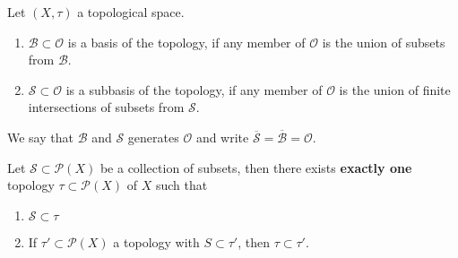 \begin{defbox}
    \begin{definition}[Base]
        Let \((X, \tau)\) a {\color{mathif}topological space}.
        \begin{enumerate}
            \item \(\mathcal{B} \subset \mathcal{O}\) is a {\color{maththen}basis} of the topology, if any member of \(\mathcal{O}\) is the {\color{mathif}union of subsets} from \(\mathcal{B}\).
            \item \(\mathcal{S} \subset \mathcal{O}\) is a {\color{maththen}subbasis} of the topology, if any member of \(\mathcal{O}\) is the {\color{mathif}union of finite intersections of subsets} from \(\mathcal{S}\).
        \end{enumerate}
        We say that \(\mathcal{B}\) and \(\mathcal{S}\) {\color{maththen}generates} \(\mathcal{O}\) and write \(\overline{\mathcal{S}} = \overline{\mathcal{B}} = \mathcal{O}\).
    \end{definition}
\end{defbox}

\begin{thmbox}
    \begin{lemma}
    Let \(\mathcal{S} \subset \mathcal{P}(X)\) be a {\color{mathobj}collection of subsets}, then there {\color{maththen}exists} \textbf{exactly one} topology \(\tau \subset \mathcal{P}(X)\) of \(X\) such that
    \begin{enumerate}
        \item \(\mathcal{S} \subset \tau\)
        \item If \(\tau' \subset \mathcal{P}(X)\) a topology with \(S \subset \tau'\), then \(\tau \subset \tau'\).
    \end{enumerate}
    \end{lemma}
\end{thmbox}

